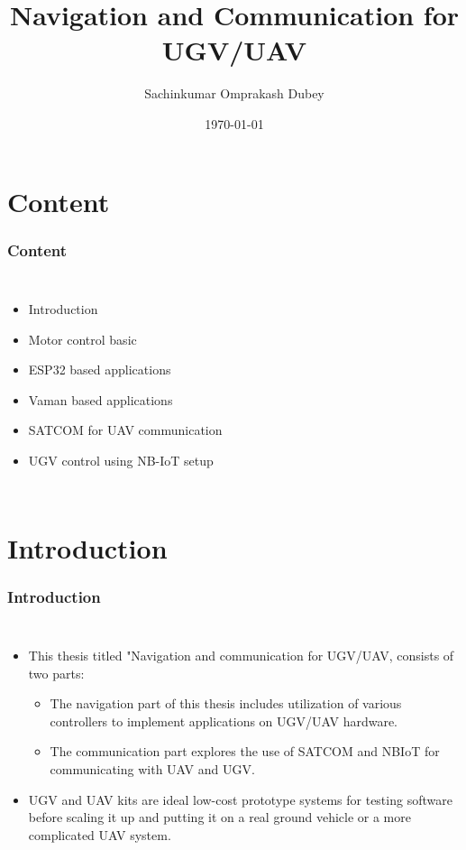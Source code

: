 \documentclass[xcolor=table]{beamer}
\title{Navigation and Communication for UGV/UAV}
\author{Sachinkumar Omprakash Dubey}
\institute{Indian Institute of Technology, Hyderabad.}
\date{\today}
\begin{document}
\begin{frame}
\titlepage
\end{frame}
\section{Content}
\begin{frame}
\frametitle{Content}
\begin{columns}
  \begin{itemize}
  \item Introduction
  \item Motor control basic
  \item ESP32 based applications
  \item Vaman based applications
  \item SATCOM for UAV communication
  \item UGV control using NB-IoT setup
  \end{itemize}
\end{columns}

\end{frame}


\section{Introduction}
\begin{frame}
\frametitle{Introduction}
\begin{columns}
  \begin{itemize}
  \item This thesis titled "Navigation and communication for UGV/UAV, consists of two parts:
   \begin{itemize}
  \item The navigation part of this thesis includes utilization of various controllers to implement applications on UGV/UAV hardware.
  \item The communication part explores the use of SATCOM and NBIoT for communicating with UAV and UGV.
  \end{itemize}
  \item UGV and UAV kits are ideal low-cost prototype systems for testing software before scaling it up and putting it on a real ground vehicle or a more complicated UAV system. 
  \end{itemize}
\end{columns}
\end{frame}
\end{document}
